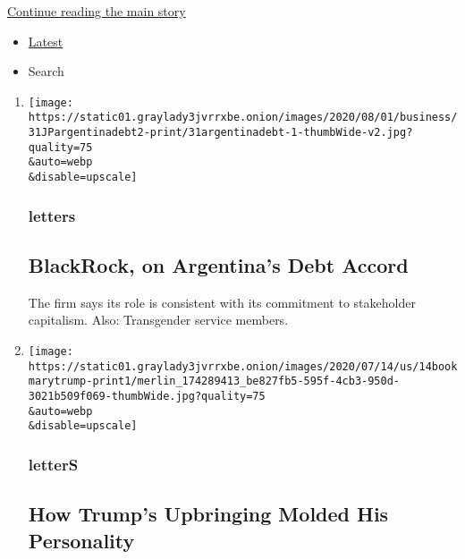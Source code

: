 \protect\hyperlink{after-mid1}{Continue reading the main story}

\begin{itemize}
\tightlist
\item
  \protect\hyperlink{stream-panel}{Latest}
\item
  Search
\end{itemize}

\begin{enumerate}
\def\labelenumi{\arabic{enumi}.}
\item
  \href{/2020/08/04/opinion/letters/blackrock-argentina.html}{}

  \texttt{[image: https://static01.graylady3jvrrxbe.onion/images/2020/08/01/business/31JPargentinadebt2-print/31argentinadebt-1-thumbWide-v2.jpg?quality=75\\\&auto=webp\\\&disable=upscale]}

  \hypertarget{letters}{%
  \subsubsection{letters}\label{letters}}

  \hypertarget{blackrock-on-argentinas-debt-accord}{%
  \subsection{BlackRock, on Argentina's Debt
  Accord}\label{blackrock-on-argentinas-debt-accord}}

  The firm says its role is consistent with its commitment to
  stakeholder capitalism. Also: Transgender service members.
\item
  \href{/2020/08/04/opinion/letters/trump-family.html}{}

  \texttt{[image: https://static01.graylady3jvrrxbe.onion/images/2020/07/14/us/14bookmarytrump-print1/merlin\_174289413\_be827fb5-595f-4cb3-950d-3021b509f069-thumbWide.jpg?quality=75\\\&auto=webp\\\&disable=upscale]}

  \hypertarget{letters-1}{%
  \subsubsection{letterS}\label{letters-1}}

  \hypertarget{how-trumps-upbringing-molded-his-personality}{%
  \subsection{How Trump's Upbringing Molded His
  Personality}\label{how-trumps-upbringing-molded-his-personality}}


\end{enumerate}
